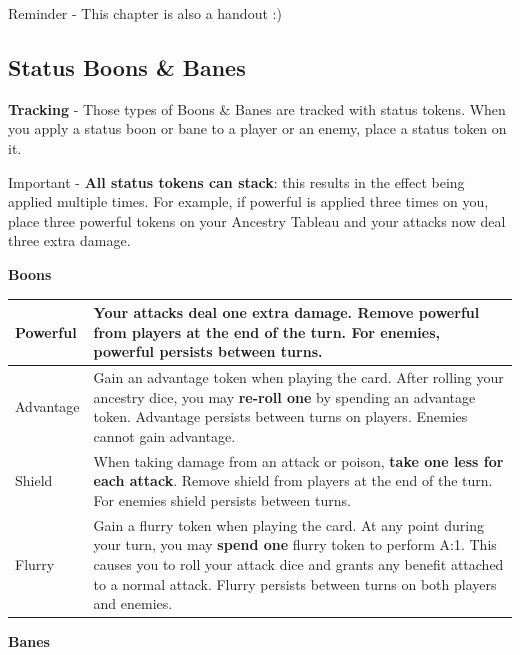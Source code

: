 \begin{tcolorbox}[colframe=blue, colback=white]
	Reminder - This chapter is also a handout :)
\end{tcolorbox}

\newpage

\subsection*{Status Boons \& Banes}
\textbf{Tracking} - Those types of Boons \& Banes are tracked with status tokens. When you apply a status boon or bane to a player or an enemy, place a status token on it.

\begin{tcolorbox}[colframe=red, colback=white]
	Important - \textbf{All status tokens can stack}: this results in the effect being applied multiple times.
	For example, if powerful is applied three times on you, place three powerful tokens on your Ancestry Tableau and your attacks now deal three extra damage.
\end{tcolorbox}

\textbf{Boons} 
\begin{longtable}{|p{2.5cm}|p{13.7cm}|}
	
	\hline
	Powerful \symPowerful & Your \symAttack attacks deal \textbf{one extra damage}. Remove powerful from players at the end of the turn. For enemies, powerful persists between turns. \\
	\hline
	Advantage \symAdvantage & Gain an advantage token when playing the card. After rolling your ancestry dice, you may \textbf{re-roll one} by spending an advantage token.   Advantage persists between turns on players. Enemies cannot gain advantage.\\
	\hline
	Shield \symShield & When taking damage from an \symAttack attack or \symPoison poison, \textbf{take one less for each attack}. Remove shield from players at the end of the turn. For enemies shield persists between turns. \\
	\hline
	Flurry \symFlurry & Gain a flurry token when playing the card. At any point during your turn, you may \textbf{spend one} flurry token to perform \symAttack A:1. This causes you to roll your attack dice and grants any benefit attached to a normal attack. Flurry persists between turns on both players and enemies. \\
	\hline
		
\end{longtable}

\textbf{Banes} 

